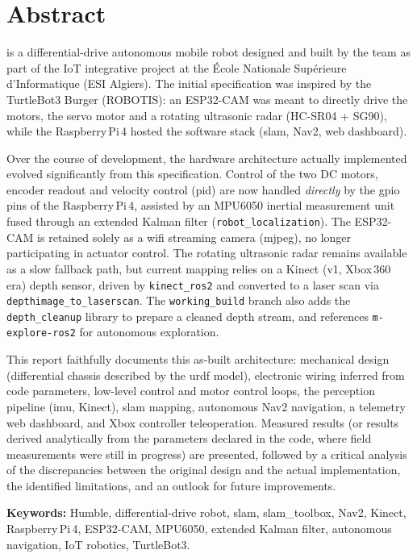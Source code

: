 \chapter*{Abstract}

\esibot{} is a differential-drive autonomous mobile robot designed and built by the team
as part of the IoT integrative project at the École Nationale Supérieure d'Informatique
(ESI Algiers). The initial specification was inspired by the TurtleBot3 Burger
(ROBOTIS): an ESP32-CAM was meant to directly drive the motors, the servo motor and a
rotating ultrasonic radar (HC-SR04 + SG90), while the Raspberry\,Pi\,4 hosted the \ros{}
software stack (\gls{slam}, Nav2, web dashboard).

Over the course of development, the hardware architecture actually implemented evolved
significantly from this specification. Control of the two DC motors, encoder readout and
velocity control (\gls{pid}) are now handled \emph{directly} by the \gls{gpio} pins of the
Raspberry\,Pi\,4, assisted by an MPU6050 inertial measurement unit fused through an
extended Kalman filter (\texttt{robot\_localization}). The ESP32-CAM is retained solely
as a \gls{wifi} streaming camera (\gls{mjpeg}), no longer participating in actuator
control. The rotating ultrasonic radar remains available as a slow fallback path, but
current mapping relies on a Kinect (v1, Xbox\,360 era) depth sensor, driven by
\texttt{kinect\_ros2} and converted to a laser scan via
\texttt{depthimage\_to\_laserscan}. The \texttt{working\_build} branch also adds the
\texttt{depth\_cleanup} library to prepare a cleaned depth stream, and references
\texttt{m-explore-ros2} for autonomous exploration.

This report faithfully documents this as-built architecture: mechanical design
(differential chassis described by the \gls{urdf} model), electronic wiring inferred
from code parameters, low-level control and motor control loops, the perception
pipeline (\gls{imu}, Kinect), \gls{slam} mapping, autonomous \ros{} Nav2 navigation, a
telemetry web dashboard, and Xbox controller teleoperation. Measured results (or results
derived analytically from the parameters declared in the code, where field measurements
were still in progress) are presented, followed by a critical analysis of the
discrepancies between the original design and the actual implementation, the identified
limitations, and an outlook for future improvements.

\vspace{6mm}
\noindent\textbf{Keywords:} \ros{} Humble, differential-drive robot, \gls{slam},
slam\_toolbox, Nav2, Kinect, Raspberry\,Pi\,4, ESP32-CAM, MPU6050, extended Kalman filter,
autonomous navigation, IoT robotics, TurtleBot3.
